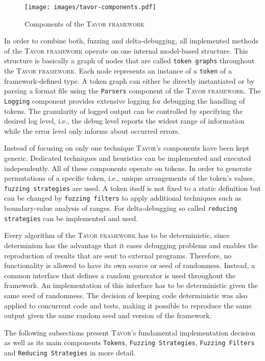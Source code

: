 \begin{figure}[ht]
\texttt{[image: images/tavor-components.pdf]}
\caption{Components of the \textsc{Tavor framework}}
\label{fig:tavor-components}
\end{figure}

In order to combine both, fuzzing and delta-debugging, all implemented methods of the \textsc{Tavor framework} operate on one internal model-based structure. This structure is basically a graph of nodes that are called \texttt{token graphs} throughout the \textsc{Tavor framework}. Each node represents an instance of a \texttt{token} of a framework-defined type. A token graph can either be directly instantiated or by parsing a format file using the \texttt{Parsers} component of the \textsc{Tavor framework}. The \texttt{Logging} component provides extensive logging for debugging the handling of tokens. The granularity of logged output can be controlled by specifying the desired log level, i.e., the debug level reports the widest range of information while the error level only informs about occurred errors.

Instead of focusing on only one technique \textsc{Tavor}'s components have been kept generic. Dedicated techniques and heuristics can be implemented and executed independently. All of these components operate on tokens. In order to generate permutations of a specific token, i.e., unique arrangements of the token's values, \texttt{fuzzing strategies} are used. A token itself is not fixed to a static definition but can be changed by \texttt{fuzzing filters} to apply additional techniques such as boundary-value analysis of ranges. For delta-debugging so called \texttt{reducing strategies} can be implemented and used.

Every algorithm of the \textsc{Tavor framework} has to be deterministic, since determinism has the advantage that it eases debugging problems and enables the reproduction of results that are sent to external programs. Therefore, no functionality is allowed to have its own source or seed of randomness. Instead, a common interface that defines a random generator is used throughout the framework. An implementation of this interface has to be deterministic given the same seed of randomness. The decision of keeping code deterministic was also applied to concurrent code and tests, making it possible to reproduce the same output given the same random seed and version of the framework.

The following subsections present \textsc{Tavor}'s fundamental implementation decision as well as its main components \texttt{Tokens}, \texttt{Fuzzing Strategies}, \texttt{Fuzzing Filters} and \texttt{Reducing Strategies} in more detail.

